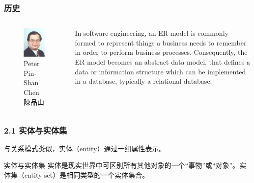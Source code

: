 \documentclass[aspectratio=169, 14pt]{beamer}
\begin{document}
\begin{frame}
    \frametitle{历史}
\begin{columns}
    \begin{figure}
        \includegraphics[width=\textwidth]{week10/chen}
        \caption*{Peter Pin-Shan Chen
        \\ 陳品山}
    \end{figure}
    In software engineering, an ER model is commonly formed to represent things a business needs to remember in order to perform business processes. Consequently, the ER model becomes an abstract data model, that defines a data or information structure which can be implemented in a database, typically a relational database. 
\end{columns}

\end{frame}

\begin{frame}
    \frametitle{2.1 实体与实体集}
与关系模式类似，实体（entity）通过一组属性表示。

\begin{exampleblock}{实体与实体集}
实体是现实世界中可区别所有其他对象的一个“事物”或“对象”。实体集（entity set）是相同类型的一个实体集合。    
\end{exampleblock}

\end{frame}
\end{document}
